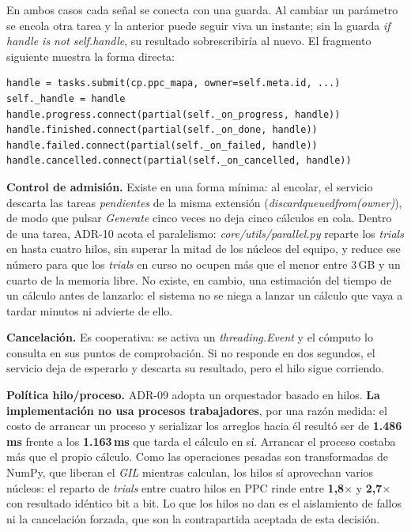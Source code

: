 \documentclass[12pt,letterpaper,oneside]{article}
\DeclareRobustCommand{\_}{\textunderscore\allowbreak}
\begin{document}
En ambos casos cada señal se conecta con una guarda. Al cambiar un parámetro se encola otra tarea y la anterior puede seguir viva un instante; sin la guarda \textit{if handle is not self.\_handle}, su resultado sobrescribiría al nuevo. El fragmento siguiente muestra la forma directa:

\begin{verbatim}
handle = tasks.submit(cp.ppc_mapa, owner=self.meta.id, ...)
self._handle = handle
handle.progress.connect(partial(self._on_progress, handle))
handle.finished.connect(partial(self._on_done, handle))
handle.failed.connect(partial(self._on_failed, handle))
handle.cancelled.connect(partial(self._on_cancelled, handle))
\end{verbatim}

\textbf{Control de admisión.} Existe en una forma mínima: al encolar, el servicio descarta las tareas \textit{pendientes} de la misma extensión (\textit{\textunderscore{}discard\_queued\_from(owner)}), de modo que pulsar \textit{Generate} cinco veces no deja cinco cálculos en cola. Dentro de una tarea, ADR-10 acota el paralelismo: \textit{core/utils/parallel.py} reparte los \textit{trials} en hasta cuatro hilos, sin superar la mitad de los núcleos del equipo, y reduce ese número para que los \textit{trials} en curso no ocupen más que el menor entre 3\,GB y un cuarto de la memoria libre. No existe, en cambio, una estimación del tiempo de un cálculo antes de lanzarlo: el sistema no se niega a lanzar un cálculo que vaya a tardar minutos ni advierte de ello.

\textbf{Cancelación.} Es cooperativa: se activa un \textit{threading.Event} y el cómputo lo consulta en sus puntos de comprobación. Si no responde en dos segundos, el servicio deja de esperarlo y descarta su resultado, pero el hilo sigue corriendo.

\textbf{Política hilo/proceso.} ADR-09 adopta un orquestador basado en hilos. \textbf{La implementación no usa procesos trabajadores}, por una razón medida: el costo de arrancar un proceso y serializar los arreglos hacia él resultó ser de \textbf{1.486\,ms} frente a los \textbf{1.163\,ms} que tarda el cálculo en sí. Arrancar el proceso costaba más que el propio cálculo. Como las operaciones pesadas son transformadas de NumPy, que liberan el \textit{GIL} mientras calculan, los hilos sí aprovechan varios núcleos: el reparto de \textit{trials} entre cuatro hilos en PPC rinde entre \textbf{1,8$\times$} y \textbf{2,7$\times$} con resultado idéntico bit a bit. Lo que los hilos no dan es el aislamiento de fallos ni la cancelación forzada, que son la contrapartida aceptada de esta decisión.
\end{document}
